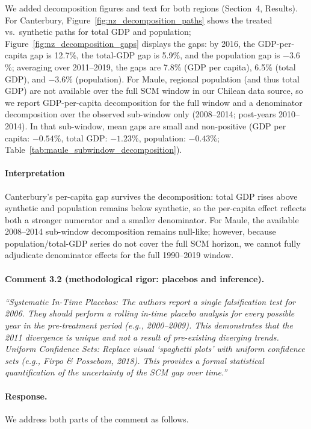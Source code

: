 We added decomposition figures and text for both regions (Section~4, Results). For Canterbury, Figure~\ref{fig:nz_decomposition_paths} shows the treated vs.\ synthetic paths for total GDP and population; Figure~\ref{fig:nz_decomposition_gaps} displays the gaps: by 2016, the GDP-per-capita gap is 12.7\%, the total-GDP gap is 5.9\%, and the population gap is $-3.6$\%; averaging over 2011--2019, the gaps are 7.8\% (GDP per capita), 6.5\% (total GDP), and $-3.6$\% (population). For Maule, regional population (and thus total GDP) are not available over the full SCM window in our Chilean data source, so we report GDP-per-capita decomposition for the full window and a denominator decomposition over the observed sub-window only (2008--2014; post-years 2010--2014). In that sub-window, mean gaps are small and non-positive (GDP per capita: $-0.54$\%, total GDP: $-1.23$\%, population: $-0.43$\%; Table~\ref{tab:maule_subwindow_decomposition}).

\paragraph{Interpretation}
Canterbury's per-capita gap survives the decomposition: total GDP rises above synthetic and population remains below synthetic, so the per-capita effect reflects both a stronger numerator and a smaller denominator. For Maule, the available 2008--2014 sub-window decomposition remains null-like; however, because population/total-GDP series do not cover the full SCM horizon, we cannot fully adjudicate denominator effects for the full 1990--2019 window.

\paragraph{Comment 3.2 (methodological rigor: placebos and inference).}
\textit{``Systematic In-Time Placebos: The authors report a single falsification test for 2006. They should perform a rolling in-time placebo analysis for every possible year in the pre-treatment period (e.g., 2000--2009). This demonstrates that the 2011 divergence is unique and not a result of pre-existing diverging trends. Uniform Confidence Sets: Replace visual `spaghetti plots' with uniform confidence sets (e.g., Firpo \& Possebom, 2018). This provides a formal statistical quantification of the uncertainty of the SCM gap over time.''}

\paragraph{Response.}
We address both parts of the comment as follows.

